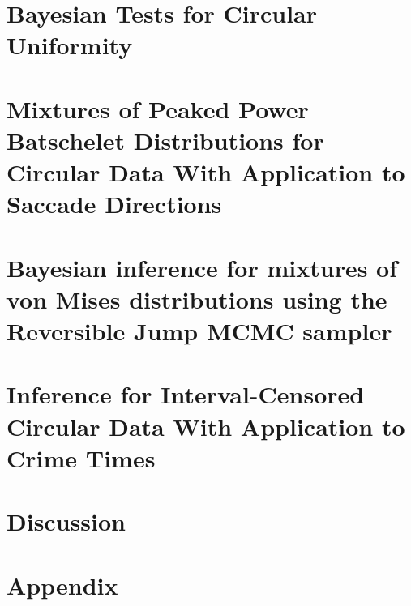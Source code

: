 \documentclass[12pt, a4paper]{book}\usepackage[]{graphicx}\usepackage[]{color}
\begin{document}
\chapter{Bayesian Tests for Circular Uniformity}
\label{hypotest}



\chapter{Mixtures of Peaked Power Batschelet Distributions for Circular Data  With Application to Saccade Directions}
\label{flexcmix}

%
%
\chapter{Bayesian inference for mixtures of von Mises distributions using the Reversible Jump MCMC sampler}
\label{revrjump}

%
\chapter{Inference for Interval-Censored Circular Data With Application to Crime Times}
\label{dpm_crim}



% 


\chapter{Discussion}




\chapter{Appendix}

\appendix






\backmatter



\end{document}
